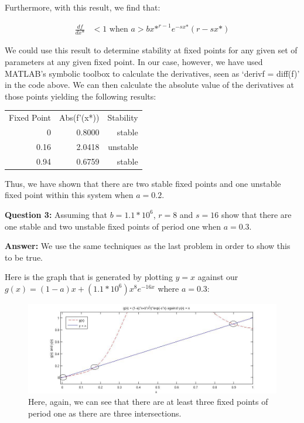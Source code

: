 Furthermore, with this result, we find that:

\begin{align*} 
	\frac{df}{dx\text{*}} &< 1 \text{ when } a > bx\text{*}^{r-1}e^{-sx\text{*}}(r-sx\text{*})
\end{align*}

We could use this result to determine stability at fixed points for any given set of parameters at any given fixed point. In our case, however, we have used MATLAB's symbolic toolbox to calculate the derivatives, seen as `derivf = diff(f)' in the code above. We can then calculate the absolute value of the derivatives at those points yielding the following results:


\begin{table}[h]
\centering
\begin{tabular}{rrr}
Fixed Point & Abs(f'(x*)) & Stability \\
0           & 0.8000      & stable    \\
0.16        & 2.0418      & unstable  \\
0.94        & 0.6759      & stable   
\end{tabular}
\end{table}

Thus, we have shown that there are two stable fixed points and one unstable fixed point within this system when $a = 0.2$.

\textbf{Question 3:} Assuming that $b=1.1*10^{6}$, $r=8$ and $s=16$ show that there are one stable and two unstable fixed points of period one when $a=0.3$.

\textbf{Answer:} We use the same techniques as the last problem in order to show this to be true.

Here is the graph that is generated by plotting $y=x$ against our $g(x) = (1-a)x+(1.1*10^{6})x^{8}e^{-16x}$ where $a = 0.3$: 

\begin{figure}[H]
    \begin{center}
    \includegraphics[width=\linewidth]{P1_Q3}
    \end{center}
    \caption{Here, again, we can see that there are at least three fixed points of period one as there are three intersections.}
    \label{figure:2.1}
\end{figure}

